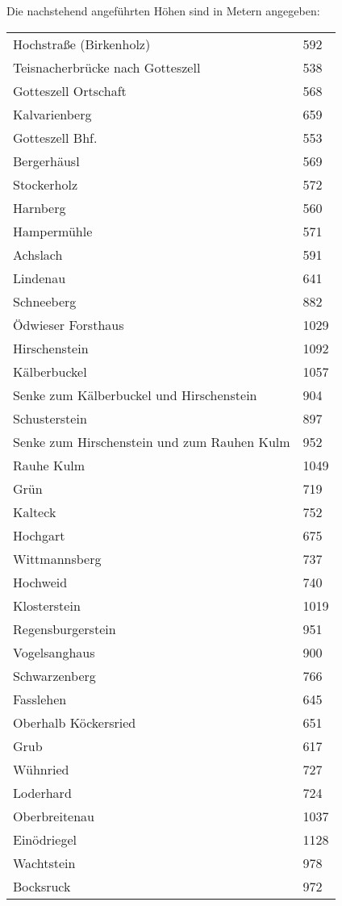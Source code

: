 \documentclass[12pt,a4paper]{book}
\begin{document}
Die nachstehend angeführten Höhen sind in Metern angegeben:

\begin{longtable}{ll}
  Hochstraße (Birkenholz) & 592 \\
  Teisnacherbrücke nach Gotteszell & 538 \\
  Gotteszell Ortschaft & 568 \\
  Kalvarienberg & 659 \\
  Gotteszell Bhf. & 553 \\
  Bergerhäusl & 569 \\
  Stockerholz & 572 \\
  Harnberg & 560 \\
  Hampermühle & 571 \\
  Achslach & 591 \\
  Lindenau & 641 \\
  Schneeberg & 882 \\
  Ödwieser Forsthaus & 1029 \\
  Hirschenstein & 1092 \\
  Kälberbuckel & 1057 \\
  Senke zum Kälberbuckel und Hirschenstein & 904 \\
  Schusterstein & 897 \\
  Senke zum Hirschenstein und zum Rauhen Kulm & 952 \\
  Rauhe Kulm & 1049 \\
  Grün & 719 \\
  Kalteck & 752 \\
  Hochgart & 675 \\
  Wittmannsberg & 737 \\
  Hochweid & 740 \\
  Klosterstein & 1019 \\
  Regensburgerstein & 951 \\
  Vogelsanghaus & 900 \\
  Schwarzenberg & 766 \\
  Fasslehen & 645 \\
  Oberhalb Köckersried & 651 \\
  Grub & 617 \\
  Wühnried & 727 \\
  Loderhard & 724 \\
  Oberbreitenau & 1037 \\
  Einödriegel & 1128 \\
  Wachtstein & 978 \\
  Bocksruck & 972 \\

\end{longtable}
\end{document}
